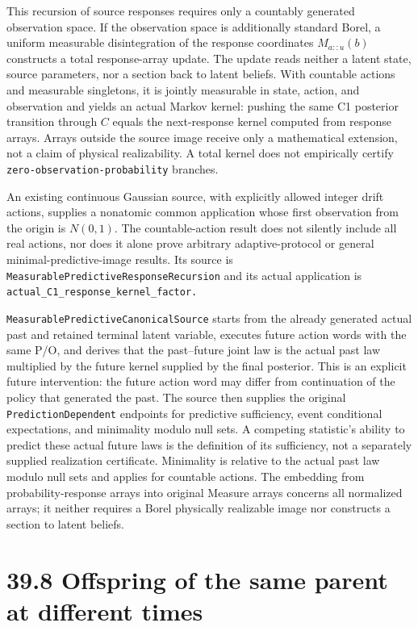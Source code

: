 \documentclass[
  english,
  11pt,
  oneside]{book}
\begin{document}
This recursion of source responses requires only a countably generated observation space. If the observation space is additionally standard Borel, a uniform measurable disintegration of the response coordinates \(M_{a::u}(b)\) constructs a total response-array update. The update reads neither a latent state, source parameters, nor a section back to latent beliefs. With countable actions and measurable singletons, it is jointly measurable in state, action, and observation and yields an actual Markov kernel: pushing the same C1 posterior transition through \(C\) equals the next-response kernel computed from response arrays. Arrays outside the source image receive only a mathematical extension, not a claim of physical realizability. A total kernel does not empirically certify \nolinkurl{zero-observation-probability} branches.

An existing continuous Gaussian source, with explicitly allowed integer drift actions, supplies a nonatomic common application whose first observation from the origin is \(N(0,1)\). The countable-action result does not silently include all real actions, nor does it alone prove arbitrary adaptive-protocol or general minimal-predictive-image results. Its source is \nolinkurl{MeasurablePredictiveResponseRecursion} and its actual application is \nolinkurl{actual_C1_response_kernel_factor.}

\nolinkurl{MeasurablePredictiveCanonicalSource} starts from the already generated actual past and retained terminal latent variable, executes future action words with the same P/O, and derives that the past--future joint law is the actual past law multiplied by the future kernel supplied by the final posterior. This is an explicit future intervention: the future action word may differ from continuation of the policy that generated the past. The source then supplies the original \nolinkurl{PredictionDependent} endpoints for predictive sufficiency, event conditional expectations, and minimality modulo null sets. A competing statistic's ability to predict these actual future laws is the definition of its sufficiency, not a separately supplied realization certificate. Minimality is relative to the actual past law modulo null sets and applies for countable actions. The embedding from probability-response arrays into original Measure arrays concerns all normalized arrays; it neither requires a Borel physically realizable image nor constructs a section to latent beliefs.

\section{39.8 Offspring of the same parent at different times}\label{offspring-of-the-same-parent-at-different-times}
\end{document}
